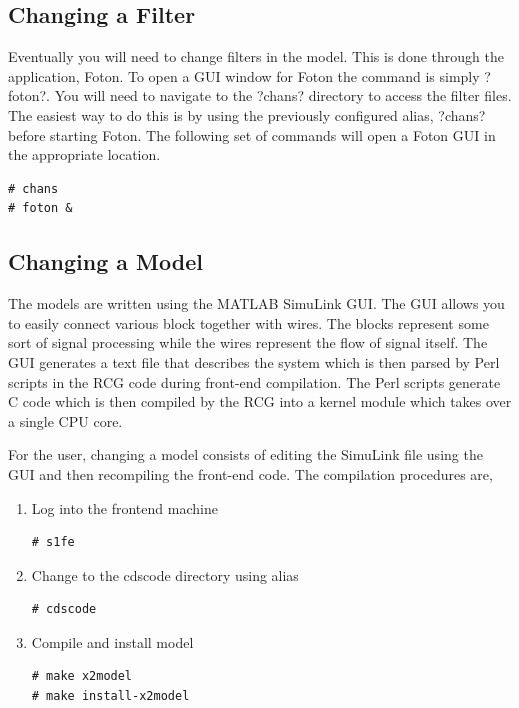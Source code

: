 \subsection{Changing a Filter}

Eventually you will need to change filters in the model. This is done through
the application, Foton. To open a GUI window for Foton the command is simply
\lstin?foton?. You will need to navigate to the \lstin?chans? directory to
access the filter files. The easiest way to do this is by using the previously
configured alias, \lstin?chans? before starting Foton. The following set of
commands will open a Foton GUI in the appropriate location.

\begin{lstlisting}
# chans
# foton &
\end{lstlisting}

\subsection{Changing a Model}

The models are written using the MATLAB SimuLink GUI. The GUI allows you
to easily connect various block together with wires. The blocks represent some
sort of signal processing while the wires represent the flow of signal itself.
The GUI generates a text file that describes the system which is then parsed
by Perl scripts in the RCG code during front-end compilation. The Perl scripts
generate C code which is then compiled by the RCG into a kernel module which
takes over a single CPU core.

For the user, changing a model consists of editing the SimuLink file using the
GUI and then recompiling the front-end code. The compilation procedures are,
\begin{enumerate}
\item Log into the frontend machine
\begin{lstlisting}
# s1fe
\end{lstlisting}
\item Change to the cdscode directory using alias
\begin{lstlisting}
# cdscode
\end{lstlisting}
\item Compile and install model
\begin{lstlisting}
# make x2model
# make install-x2model
\end{lstlisting}
\end{enumerate}


